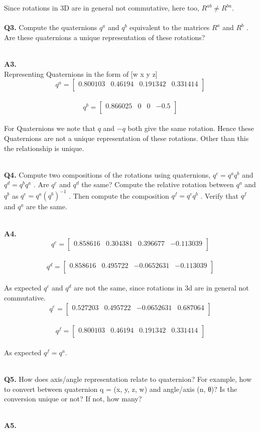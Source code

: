 \documentclass{article}
\newcommand\Problem[1]{
  \\
  \textbf{Q#1.}
}
\newcommand\Sol[1]{
  \\
  \textbf{A#1.}
  \\
}
\begin{document}
Since rotations in 3D are in general not commutative, here too, $R^{ab} \neq R^{ba}$.
\\
\Problem{3} Compute the quaternions $q^a$ and $q^b$ equivalent to the matrices $R^a$ and $R^b$ . Are these quaternions a unique representation of these rotations?
\Sol{3}
Representing Quaternions in the form of [w x y z]
\[
  q^a =
  \begin{bmatrix}
    0.800103 & 0.46194 & 0.191342 & 0.331414\\
  \end{bmatrix}
\]
\\
\[
  q^b =
  \begin{bmatrix}
    0.866025 &
       0 &
       0 &
    -0.5 \\

  \end{bmatrix}
\]
\\
For Quaternions we note that $q$ and $-q$ both give the same rotation. Hence these Quaternions are not a unique representation of these rotations. Other than this the relationship is unique.

\Problem{4} Compute two compositions of the rotations using quaternions, $q^c = q^aq^b$ and 
$q^d = q^bq^a$ . Are $q^c$ and $q^d$ the same? Compute the relative rotation between $q^a$ and
$q^b$ as $q^e = q^a(q^b)^{-1}$ . Then compute the composition $q^f = q^eq^b$ . Verify that $q^f$ and
$q^a$ are the same.
\Sol{4}
\[
  q^c =
  \begin{bmatrix}
    0.858616&
    0.304381&
    0.396677&
    -0.113039\\
  \end{bmatrix}
\]
\\
\[
  q^d =
  \begin{bmatrix}
    0.858616&
    0.495722&
    -0.0652631&
    -0.113039\\
  \end{bmatrix}
\]
\\
As expected $q^c$ and $q^d$ are not the same, since rotations in 3d are in general not commutative.
\[
  q^e =
  \begin{bmatrix}
    0.527203&
    0.495722&
    -0.0652631&
    0.687064\\
  \end{bmatrix}
\]
\\
\[
  q^f =
  \begin{bmatrix}
    0.800103&
    0.46194&
    0.191342&
    0.331414\\
  \end{bmatrix}
\]
\\
As expected $q^f = q^a$.

\Problem{5} How does axis/angle representation relate to quaternion? For example, how to
convert between quaternion q = (x, y, z, w) and angle/axis (n, θ)? Is the conversion
unique or not? If not, how many?
\Sol{5}
\end{document}
